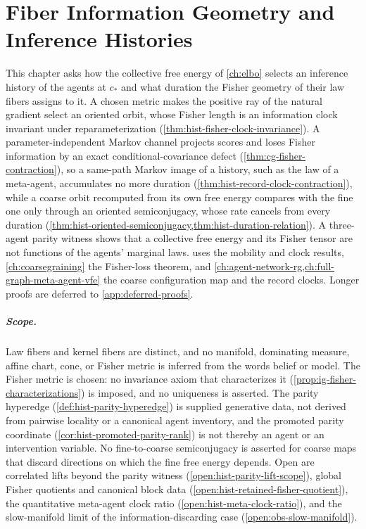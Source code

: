 \chapter{Fiber Information Geometry and Inference Histories}
\label{ch:relational-inference}

This chapter asks how the collective free energy of \cref{ch:elbo} selects an
inference history of the agents at $c_*$ and what duration the Fisher geometry of their
law fibers assigns to it.  A chosen metric makes the positive ray of the natural
gradient select an oriented orbit, whose Fisher length is an information clock
invariant under reparameterization (\cref{thm:hist-fisher-clock-invariance}).  A
parameter-independent Markov channel projects scores and loses Fisher information by an
exact conditional-covariance defect (\cref{thm:cg-fisher-contraction}), so a same-path
Markov image of a history, such as the law of a meta-agent, accumulates no more duration
(\cref{thm:hist-record-clock-contraction}), while a coarse orbit recomputed from its own
free energy compares with the fine one only through an oriented semiconjugacy, whose
rate cancels from every duration
(\cref{thm:hist-oriented-semiconjugacy,thm:hist-duration-relation}).  A three-agent
parity witness shows that a collective free energy and its Fisher tensor are not
functions of the agents' marginal laws.   uses the mobility and
clock results, \cref{ch:coarsegraining} the Fisher-loss theorem, and
\cref{ch:agent-network-rg,ch:full-graph-meta-agent-vfe} the coarse configuration map and
the record clocks.  Longer proofs are deferred to \cref{app:deferred-proofs}.

\paragraph{Scope.}
Law fibers and kernel fibers are distinct, and no manifold, dominating measure, affine
chart, cone, or Fisher metric is inferred from the words belief or model.  The Fisher
metric is chosen: no invariance axiom that characterizes it
(\cref{prop:ig-fisher-characterizations}) is imposed, and no uniqueness is asserted.  The
parity hyperedge (\cref{def:hist-parity-hyperedge}) is supplied generative data, not
derived from pairwise locality or a canonical agent inventory, and the promoted parity
coordinate (\cref{cor:hist-promoted-parity-rank}) is not thereby an agent or an
intervention variable.  No fine-to-coarse semiconjugacy is asserted for coarse maps that
discard directions on which the fine free energy depends.  Open are correlated lifts
beyond the parity witness (\cref{open:hist-parity-lift-scope}), global Fisher quotients
and canonical block data (\cref{open:hist-retained-fisher-quotient}), the quantitative
meta-agent clock ratio (\cref{open:hist-meta-clock-ratio}), and the slow-manifold limit
of the information-discarding case (\cref{open:obs-slow-manifold}).  

